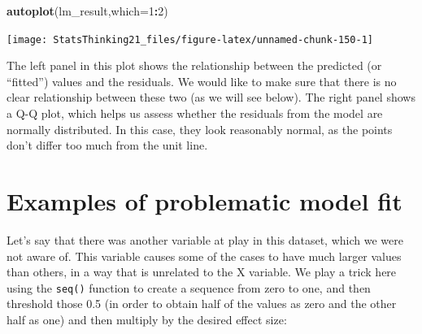 \documentclass[12pt,]{book}
\newenvironment{Shaded}{\begin{snugshade}}{\end{snugshade}}
\newcommand{\DataTypeTok}[1]{\textcolor[rgb]{0.13,0.29,0.53}{#1}}
\newcommand{\DecValTok}[1]{\textcolor[rgb]{0.00,0.00,0.81}{#1}}
\newcommand{\FloatTok}[1]{\textcolor[rgb]{0.00,0.00,0.81}{#1}}
\newcommand{\KeywordTok}[1]{\textcolor[rgb]{0.13,0.29,0.53}{\textbf{#1}}}
\newcommand{\NormalTok}[1]{#1}
\newcommand{\OperatorTok}[1]{\textcolor[rgb]{0.81,0.36,0.00}{\textbf{#1}}}
\newcommand{\StringTok}[1]{\textcolor[rgb]{0.31,0.60,0.02}{#1}}
\begin{document}
\begin{Shaded}
\begin{Highlighting}[]
\KeywordTok{autoplot}\NormalTok{(lm_result,}\DataTypeTok{which=}\DecValTok{1}\OperatorTok{:}\DecValTok{2}\NormalTok{)}
\end{Highlighting}
\end{Shaded}

\texttt{[image: StatsThinking21\_files/figure-latex/unnamed-chunk-150-1]}

The left panel in this plot shows the relationship between the predicted (or ``fitted'') values and the residuals. We would like to make sure that there is no clear relationship between these two (as we will see below). The right panel shows a Q-Q plot, which helps us assess whether the residuals from the model are normally distributed. In this case, they look reasonably normal, as the points don't differ too much from the unit line.

\hypertarget{examples-of-problematic-model-fit}{%
\section{Examples of problematic model fit}\label{examples-of-problematic-model-fit}}

Let's say that there was another variable at play in this dataset, which we were not aware of. This variable causes some of the cases to have much larger values than others, in a way that is unrelated to the X variable. We play a trick here using the \texttt{seq()} function to create a sequence from zero to one, and then threshold those 0.5 (in order to obtain half of the values as zero and the other half as one) and then multiply by the desired effect size:

\begin{Shaded}
\end{Shaded}
\end{document}

